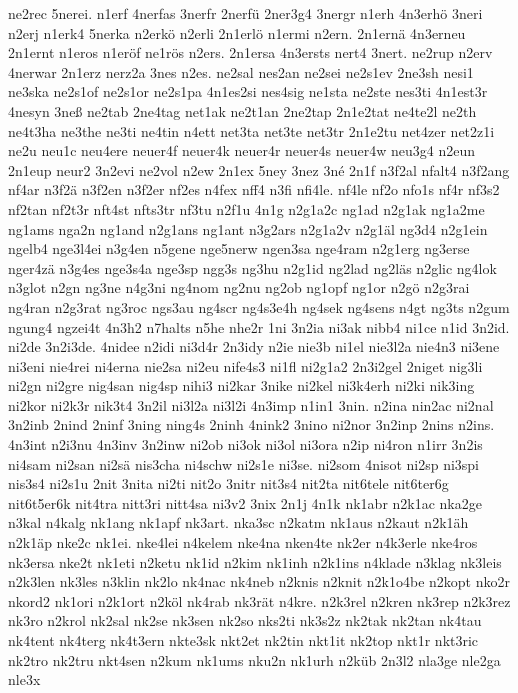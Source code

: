 {ne2rec
5nerei.
n1erf
4nerfas
3nerfr
2nerfü
2ner3g4
3nergr
n1erh
4n3erhö
3neri
n2erj
n1erk4
5nerka
n2erkö
n2erli
2n1erlö
n1ermi
n2ern.
2n1ernä
4n3erneu
2n1ernt
n1eros
n1eröf
ne1rös
n2ers.
2n1ersa
4n3ersts
nert4
3nert.
ne2rup
n2erv
4nerwar
2n1erz
nerz2a
3nes
n2es.
ne2sal
nes2an
ne2sei
ne2s1ev
2ne3sh
nesi1
ne3ska
ne2s1of
ne2s1or
ne2s1pa
4n1es2si
nes4sig
ne1sta
ne2ste
nes3ti
4n1est3r
4nesyn
3neß
ne2tab
2ne4tag
net1ak
ne2t1an
2ne2tap
2n1e2tat
ne4te2l
ne2th
ne4t3ha
ne3the
ne3ti
ne4tin
n4ett
net3ta
net3te
net3tr
2n1e2tu
net4zer
net2z1i
ne2u
neu1c
neu4ere
neuer4f
neuer4k
neuer4r
neuer4s
neuer4w
neu3g4
n2eun
2n1eup
neur2
3n2evi
ne2vol
n2ew
2n1ex
5ney
3nez
3né
2n1f
n3f2al
nfalt4
n3f2ang
nf4ar
n3f2ä
n3f2en
n3f2er
nf2es
n4fex
nff4
n3fi
nfi4le.
nf4le
nf2o
nfo1s
nf4r
nf3s2
nf2tan
nf2t3r
nft4st
nfts3tr
nf3tu
n2f1u
4n1g
n2g1a2c
ng1ad
n2g1ak
ng1a2me
ng1ams
nga2n
ng1and
n2g1ans
ng1ant
n3g2ars
n2g1a2v
n2g1äl
ng3d4
n2g1ein
ngelb4
nge3l4ei
n3g4en
n5gene
nge5nerw
ngen3sa
nge4ram
n2g1erg
ng3erse
nger4zä
n3g4es
nge3s4a
nge3sp
ngg3s
ng3hu
n2g1id
ng2lad
ng2läs
n2glic
ng4lok
n3glot
n2gn
ng3ne
n4g3ni
ng4nom
ng2nu
ng2ob
ng1opf
ng1or
n2gö
n2g3rai
ng4ran
n2g3rat
ng3roc
ngs3au
ng4scr
ng4s3e4h
ng4sek
ng4sens
n4gt
ng3ts
n2gum
ngung4
ngzei4t
4n3h2
n7halts
n5he
nhe2r
1ni
3n2ia
ni3ak
nibb4
ni1ce
n1id
3n2id.
ni2de
3n2i3de.
4nidee
n2idi
ni3d4r
2n3idy
n2ie
nie3b
ni1el
nie3l2a
nie4n3
ni3ene
ni3eni
nie4rei
ni4erna
nie2sa
ni2eu
nife4s3
ni1fl
ni2g1a2
2n3i2gel
2niget
nig3li
ni2gn
ni2gre
nig4san
nig4sp
nihi3
ni2kar
3nike
ni2kel
ni3k4erh
ni2ki
nik3ing
ni2kor
ni2k3r
nik3t4
3n2il
ni3l2a
ni3l2i
4n3imp
n1in1
3nin.
n2ina
nin2ac
ni2nal
3n2inb
2nind
2ninf
3ning
ning4s
2ninh
4nink2
3nino
ni2nor
3n2inp
2nins
n2ins.
4n3int
n2i3nu
4n3inv
3n2inw
ni2ob
ni3ok
ni3ol
ni3ora
n2ip
ni4ron
n1irr
3n2is
ni4sam
ni2san
ni2sä
nis3cha
ni4schw
ni2s1e
ni3se.
ni2som
4nisot
ni2sp
ni3spi
nis3s4
ni2s1u
2nit
3nita
ni2ti
nit2o
3nitr
nit3s4
nit2ta
nit6tele
nit6ter6g
nit6t5er6k
nit4tra
nitt3ri
nitt4sa
ni3v2
3nix
2n1j
4n1k
nk1abr
n2k1ac
nka2ge
n3kal
n4kalg
nk1ang
nk1apf
nk3art.
nka3sc
n2katm
nk1aus
n2kaut
n2k1äh
n2k1äp
nke2c
nk1ei.
nke4lei
n4kelem
nke4na
nken4te
nk2er
n4k3erle
nke4ros
nk3ersa
nke2t
nk1eti
n2ketu
nk1id
n2kim
nk1inh
n2k1ins
n4klade
n3klag
nk3leis
n2k3len
nk3les
n3klin
nk2lo
nk4nac
nk4neb
n2knis
n2knit
n2k1o4be
n2kopt
nko2r
nkord2
nk1ori
n2k1ort
n2köl
nk4rab
nk3rät
n4kre.
n2k3rel
n2kren
nk3rep
n2k3rez
nk3ro
n2krol
nk2sal
nk2se
nk3sen
nk2so
nks2ti
nk3s2z
nk2tak
nk2tan
nk4tau
nk4tent
nk4terg
nk4t3ern
nkte3sk
nkt2et
nk2tin
nkt1it
nk2top
nkt1r
nkt3ric
nk2tro
nk2tru
nkt4sen
n2kum
nk1ums
nku2n
nk1urh
n2küb
2n3l2
nla3ge
nle2ga
nle3x
}
